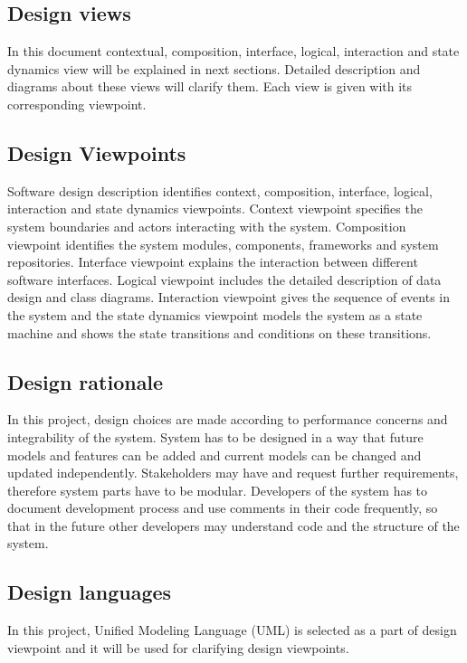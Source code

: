 \subsection{Design views}
\qquad In this document contextual, composition, interface, logical, interaction and state dynamics view will be explained in next sections. Detailed description and diagrams about these views will clarify them. Each view is given with its corresponding viewpoint.
\subsection{Design Viewpoints}
\qquad Software design description identifies context, composition, interface, logical, interaction and state dynamics viewpoints. Context viewpoint specifies the system boundaries and actors interacting with the system. Composition viewpoint identifies the system modules, components, frameworks and system repositories. Interface viewpoint explains the interaction between different software interfaces. Logical viewpoint includes the detailed description of data design and class diagrams. Interaction viewpoint gives the sequence of events in the system and the state dynamics viewpoint models the system as a state machine and shows the state transitions and conditions on these transitions.
\subsection{Design rationale}
\qquad In this project, design choices are made according to performance concerns and integrability of the system. System has to be designed in a way that future models and features can be added and current models can be changed and updated independently. Stakeholders may have and request further requirements, therefore system parts have to be modular. Developers of the system has to document development process and use comments in their code frequently, so that in the future other developers may understand code and the structure of the system.
\subsection{Design languages}
\qquad In this project, Unified Modeling Language (UML) is selected as a part of design viewpoint and it will be used for clarifying design viewpoints.  